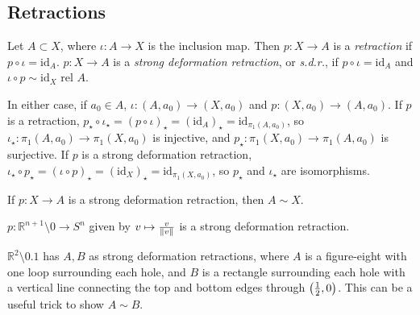 \subsection{Retractions}
\begin{definition}
	Let \( A \subset X \), where \( \iota \colon A \to X \) is the inclusion map.
	Then \( p \colon X \to A \) is a \emph{retraction} if \( p \circ \iota = \mathrm{id}_A \).
	\( p \colon X \to A \) is a \emph{strong deformation retraction}, or \emph{s.d.r.}, if \( p \circ \iota = \mathrm{id}_A \) and \( \iota \circ p \sim \mathrm{id}_X \text{ rel } A \).
\end{definition}
\begin{remark}
	In either case, if \( a_0 \in A \), \( \iota \colon (A, a_0) \to (X, a_0) \) and \( p \colon (X, a_0) \to (A, a_0) \).
	If \( p \) is a retraction, \( p_\star \circ \iota_\star = (p \circ \iota)_\star = (\mathrm{id}_A)_\star = \mathrm{id}_{\pi_1(A,a_0)} \), so \( \iota_\star \colon \pi_1(A, a_0) \to \pi_1(X, a_0) \) is injective, and \( p_\star \colon \pi_1(X, a_0) \to \pi_1(A, a_0) \) is surjective.
	If \( p \) is a strong deformation retraction, \( \iota_\star \circ p_\star = (\iota \circ p)_\star = (\mathrm{id}_X)_\star = \mathrm{id}_{\pi_1(X,a_0)} \), so \( p_\star \) and \( \iota_\star \) are isomorphisms.
\end{remark}
\begin{remark}
	If \( p \colon X \to A \) is a strong deformation retraction, then \( A \sim X \).
\end{remark}
\begin{example}
	\( p \colon \mathbb R^{n+1} \setminus \qty{0} \to S^n \) given by \( v \mapsto \frac{v}{\norm{v}} \) is a strong deformation retraction.
\end{example}
\begin{example}
	\( \mathbb R^2 \setminus \qty{0,1} \) has \( A, B \) as strong deformation retractions, where \( A \) is a figure-eight with one loop surrounding each hole, and \( B \) is a rectangle surrounding each hole with a vertical line connecting the top and bottom edges through \( \qty(\frac 12, 0) \).
	This can be a useful trick to show \( A \sim B \).
\end{example}

